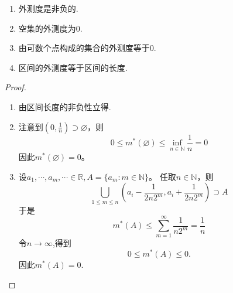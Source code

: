 \documentclass[lang=cn,newtx,10pt,scheme=chinese]{../Template/elegantbook}
\begin{document}
\begin{proposition}[常见集合的Lebesgue外测度]\label{proposition:常见集合的Lebesgue外测度}
\begin{enumerate}[(1)]
  \item 外测度是非负的.

  \item 空集的外测度为0.

  \item 由可数个点构成的集合的外测度等于0.

  \item 区间的外测度等于区间的长度.
\end{enumerate}
\end{proposition}
\begin{proof}
\begin{enumerate}[(1)]
  \item 由区间长度的非负性立得.

  \item 注意到\((0,\frac{1}{n})\supset\varnothing\)，则
  \[
  0\leq m^*(\varnothing)\leq\inf_{n\in\mathbb{N}}\frac{1}{n}=0
  \]
  因此\(m^*(\varnothing)=0\)。

  \item 设\(a_1,\cdots,a_m,\cdots\in\mathbb{R},A = \{a_m:m\in\mathbb{N}\}\)。
  任取\(n\in\mathbb{N}\)，则
  \[
  \bigcup_{1\leq m\leq n}\left(a_i - \frac{1}{2n2^m},a_i + \frac{1}{2n2^m}\right)\supset A
  \]
  于是
  \[
  m^*(A)\leq\sum_{m = 1}^{\infty}\frac{1}{n2^m}=\frac{1}{n}
  \]
  令\(n\rightarrow\infty\),得到
  \[
  0\leq m^*(A)\leq0.
  \]
  因此\(m^*(A)=0\).


\end{enumerate}
\end{proof}
\end{document}
